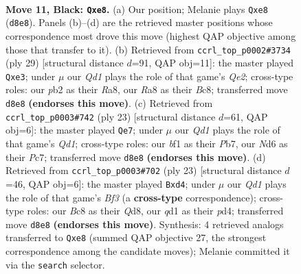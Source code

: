 \documentclass[11pt]{article}
\begin{document}
\begin{figure}[p]\centering
\begin{subfigure}{0.46\textwidth}\centering
\resizebox{\linewidth}{!}{%
\newchessgame
\chessboard[
  setfen={r1bqR1k1/pppp1ppp/3n1b2/8/3P4/8/PPP2PPP/RNBQ1BK1 b - - 0 11},
  showmover=false,
  pgfstyle=straightmove, color=movearrow, markmove={d8-e8}
]}
\caption{}
\end{subfigure}\hfill
\begin{subfigure}{0.46\textwidth}\centering
\resizebox{\linewidth}{!}{%
\newchessgame
\chessboard[
  setfen={r1b1n1k1/ppp1qppp/5b2/3p4/3P1B2/4Q2P/PPPN1PP1/R4BK1 b - - 0 15},
  showmover=false,
  pgfstyle=straightmove, color=movearrow, markmove={e7-e3}
]}
\caption{}
\end{subfigure}
\\[4pt]
\begin{subfigure}{0.46\textwidth}\centering
\resizebox{\linewidth}{!}{%
\newchessgame
\chessboard[
  setfen={r1bq2k1/pppp1ppp/3n1b2/8/3P4/2P5/PP3PPP/RNB1QBK1 b - - 0 12},
  showmover=false,
  pgfstyle=straightmove, color=movearrow, markmove={d8-e7}
]}
\caption{}
\end{subfigure}\hfill
\begin{subfigure}{0.46\textwidth}\centering
\resizebox{\linewidth}{!}{%
\newchessgame
\chessboard[
  setfen={r1bq2k1/pppp1ppp/3n1b2/8/3P1B2/8/PPP2PPP/RN2QBK1 b - - 0 12},
  showmover=false,
  pgfstyle=straightmove, color=movearrow, markmove={f6-d4}
]}
\caption{}
\end{subfigure}
\caption{\textbf{Move 11, Black: \texttt{Qxe8}.} (a) Our position; Melanie plays \texttt{Qxe8} (\texttt{d8e8}). Panels (b)--(d) are the retrieved master positions whose correspondence most drove this move (highest QAP objective among those that transfer to it). (b) Retrieved from \texttt{ccrl\_top\_p0002\#3734} (ply 29) [structural distance $d$=91, QAP obj=11]: the master played \texttt{Qxe3}; under $\mu$ our \emph{Qd1} plays the role of that game's \emph{Qe2}; cross-type roles: our \emph{p}b2 as their \emph{R}a8, our \emph{R}a8 as their \emph{B}c8; transferred move \texttt{d8e8} \textbf{(endorses this move)}. (c) Retrieved from \texttt{ccrl\_top\_p0003\#742} (ply 23) [structural distance $d$=61, QAP obj=6]: the master played \texttt{Qe7}; under $\mu$ our \emph{Qd1} plays the role of that game's \emph{Qd1}; cross-type roles: our \emph{b}f1 as their \emph{P}b7, our \emph{N}d6 as their \emph{P}c7; transferred move \texttt{d8e8} \textbf{(endorses this move)}. (d) Retrieved from \texttt{ccrl\_top\_p0003\#702} (ply 23) [structural distance $d$=46, QAP obj=6]: the master played \texttt{Bxd4}; under $\mu$ our \emph{Qd1} plays the role of that game's \emph{Bf3} (a \textbf{cross-type} correspondence); cross-type roles: our \emph{B}c8 as their \emph{Q}d8, our \emph{q}d1 as their \emph{p}d4; transferred move \texttt{d8e8} \textbf{(endorses this move)}. Synthesis: 4 retrieved analogs transferred to \texttt{Qxe8} (summed QAP objective 27, the strongest correspondence among the candidate moves); Melanie committed it via the \texttt{search} selector.}
\label{fig:thought-m21}
\end{figure}
\end{document}
